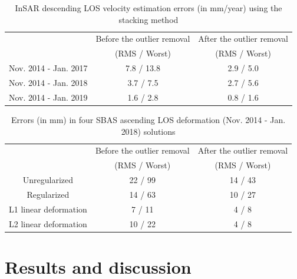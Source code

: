\documentclass{utexasthesis}
\begin{document}
\begin{table}
	\caption{InSAR descending LOS velocity estimation errors (in mm/year) using the stacking method}
	\begin{tabular}{|c|c|c|}
		\hline 
		& Before the outlier removal & After the outlier removal \\
		& (RMS / Worst) & (RMS / Worst) \\
		\hline 
		Nov. 2014 - Jan. 2017 & 7.8 / 13.8                            & 2.9 / 5.0                          \\\hline
		Nov. 2014 - Jan. 2018 & 3.7 / 7.5                             & 2.7 / 5.6                          \\\hline
		Nov. 2014 - Jan. 2019 & 1.6 / 2.8                             & 0.8 / 1.6  \\\hline     
	\end{tabular}
	\label{tab:gps-error-85}
\end{table}

\begin{table}
	\caption{Errors (in mm) in four SBAS ascending LOS deformation (Nov. 2014 - Jan. 2018) solutions}
	\centering
	\begin{tabular}{|c|c|c|}
		\hline 
		& Before the outlier removal & After the outlier removal \\
		& (RMS / Worst) & (RMS / Worst) \\
		\hline
		Unregularized &  22 / 99     &  14 / 43         \\\hline
		Regularized   &    14 / 63   &   10  / 27       \\\hline
		L1 linear deformation          &   7 / 11      & 4 / 8      \\\hline
		L2 linear deformation          &   10 / 22        & 4 / 8      \\\hline
	\end{tabular}
	\label{tab:compare-errors}
\end{table}



\section{Results and discussion}
\end{document}
